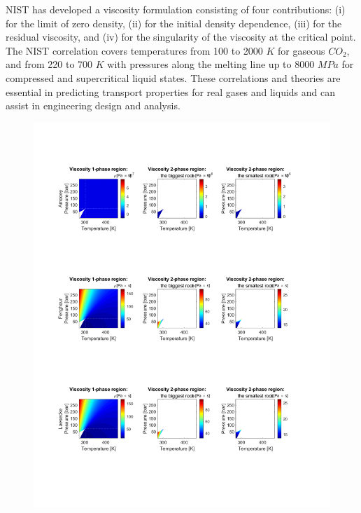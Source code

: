 \documentclass[../Article_Model_Parameters.tex]{subfiles}
\begin{document}
	NIST has developed a viscosity formulation consisting of four contributions: (i) for the limit of zero density, (ii) for the initial density dependence, (iii) for the residual viscosity, and (iv) for the singularity of the viscosity at the critical point. The NIST correlation covers temperatures from 100 to 2000 $K$ for gaseous $CO_2$, and from 220 to 700 $K$ with pressures along the melting line up to 8000 $MPa$ for compressed and supercritical liquid states. These correlations and theories are essential in predicting transport properties for real gases and liquids and can assist in engineering design and analysis.
	
	\begin{figure}[H]
		\centering
		\includegraphics[trim = 1.5cm 11.5cm 2.5cm 10.0cm,clip,width=\textwidth]{Figures/MU.pdf}	

\end{figure}
\end{document}

